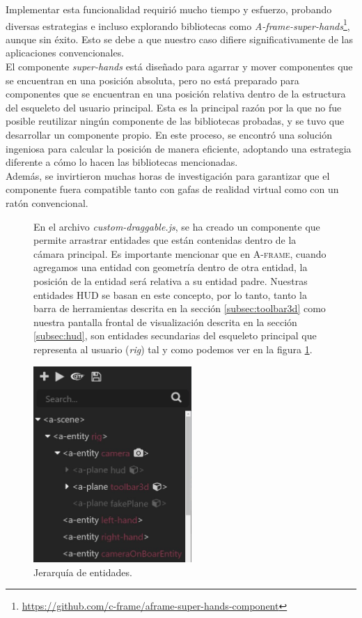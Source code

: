 \documentclass[a4paper, 11pt]{book}
\begin{document}
Implementar esta funcionalidad requirió mucho tiempo y esfuerzo, probando diversas estrategias e incluso explorando bibliotecas como \emph{A-frame-super-hands}\footnote{\url{https://github.com/c-frame/aframe-super-hands-component}}, aunque sin éxito. Esto se debe a que nuestro caso difiere significativamente de las aplicaciones convencionales.\\
El componente \emph{super-hands} está diseñado para agarrar y mover componentes que se encuentran en una posición absoluta, pero no está preparado para componentes que se encuentran en una posición relativa dentro de la estructura del esqueleto del usuario principal. Esta es la principal razón por la que no fue posible reutilizar ningún componente de las bibliotecas probadas, y se tuvo que desarrollar un componente propio. En este proceso, se encontró una solución ingeniosa para calcular la posición de manera eficiente, adoptando una estrategia diferente a cómo lo hacen las bibliotecas mencionadas. \\
Además, se invirtieron muchas horas de investigación para garantizar que el componente fuera compatible tanto con gafas de realidad virtual como con un ratón convencional.\\
\begin{figure}[H]
  \begin{minipage}[b]{0.58\linewidth}
    En el archivo \emph{custom-draggable.js}, se ha creado un componente que permite arrastrar entidades que están contenidas dentro de la cámara principal. Es importante mencionar que en \textsc{A-frame}, cuando agregamos una entidad con geometría dentro de otra entidad, la posición de la entidad será relativa a su entidad padre. Nuestras entidades \textsc{HUD} se basan en este concepto, por lo tanto, tanto la barra de herramientas descrita en la sección \ref{subsec:toolbar3d} como nuestra pantalla frontal de visualización descrita en la sección \ref{subsec:hud}, son entidades secundarias del esqueleto principal que representa al usuario (\emph{rig}) tal y como podemos ver en la figura \ref{fig:jerarquiaEntidadesRig}.
  \end{minipage}%
  \hfill
  \begin{minipage}[b]{0.4\linewidth}
    \centering
    \includegraphics[width=6cm, keepaspectratio]{img/jerarquiaRig.jpg}
    \caption{Jerarquía de entidades.}
    \label{fig:jerarquiaEntidadesRig}    
  \end{minipage}
\end{figure}
\end{document}
